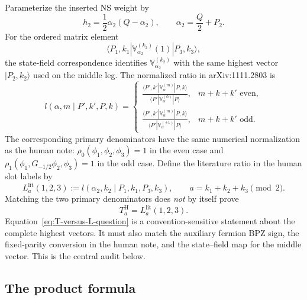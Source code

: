 \documentclass[11pt]{article}
\begin{document}
Parameterize the inserted NS weight by
\begin{equation}
 h_2=\frac12\alpha_2(Q-\alpha_2),
 \qquad
 \alpha_2=\frac Q2+P_2.
 \label{eq:alpha-dictionary}
\end{equation}
For the ordered matrix element
\begin{equation}
 \langle P_1,k_1|\mathbb V_{\alpha_2}^{(k_2)}(1)|P_3,k_3\rangle,
 \label{eq:ordered-matrix-element}
\end{equation}
the state-field correspondence identifies
\(\mathbb V_{\alpha_2}^{(k_2)}\) with the same highest vector
\(|P_2,k_2\rangle\) used on the middle leg.  The normalized ratio in
arXiv:1111.2803 is
\begin{equation}
 l(\alpha,m\mid P',k',P,k)
 =\begin{cases}
 \displaystyle
 \frac{\langle P',k'|\mathbb V_\alpha^{(m)}|P,k\rangle}
 {\langle P'|\mathbb V_\alpha^{(0)}|P\rangle},
 &m+k+k'\text{ even},\\[1.1em]
 \displaystyle
 \frac{\langle P',k'|\mathbb V_\alpha^{(m)}|P,k\rangle}
 {\langle P'|\mathbb V_\alpha^{(\pm1)}|P\rangle},
 &m+k+k'\text{ odd}.
 \end{cases}
 \label{eq:l-definition}
\end{equation}
The corresponding primary denominators have the same numerical normalization
as the human note:
\(\rho_0(\phi_1,\phi_2,\phi_3)=1\) in the even case and
\(\rho_1(\phi_1,G_{-1/2}\phi_2,\phi_3)=1\) in the odd case.  Define the
literature ratio in the human slot labels by
\begin{equation}
 L_a^{\mathrm{lit}}(1,2,3)
 :=l(\alpha_2,k_2\mid P_1,k_1,P_3,k_3),
 \qquad
 a=k_1+k_2+k_3\pmod2.
 \label{eq:L-lit-definition}
\end{equation}
Matching the two primary denominators does \emph{not} by itself prove
\begin{equation}
 T_a^{\mathrm H}=L_a^{\mathrm{lit}}(1,2,3).
 \label{eq:T-versus-L-question}
\end{equation}
Equation~\eqref{eq:T-versus-L-question} is a convention-sensitive statement
about the complete highest vectors.  It must also match the auxiliary
fermion BPZ sign, the fixed-parity conversion in the human note, and the
state--field map for the middle vector.  This is the central audit below.

\subsection{The product formula}
\end{document}
